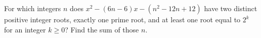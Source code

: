 For which integers $n$ does $x^2-(6n-6)x-(n^2-12n+12)$ have two distinct positive integer roots, exactly one prime root, and at least one root equal to $2^k$ for an integer $k\ge0$? Find the sum of those $n$.
